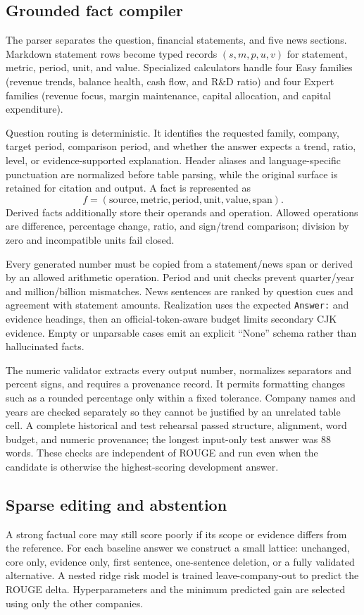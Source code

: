 \documentclass[11pt]{article}
\begin{document}
\subsection{Grounded fact compiler}
The parser separates the question, financial statements, and five news sections. Markdown statement rows become typed records $(s,m,p,u,v)$ for statement, metric, period, unit, and value. Specialized calculators handle four Easy families (revenue trends, balance health, cash flow, and R\&D ratio) and four Expert families (revenue focus, margin maintenance, capital allocation, and capital expenditure).

Question routing is deterministic.  It identifies the requested family,
company, target period, comparison period, and whether the answer expects a
trend, ratio, level, or evidence-supported explanation.  Header aliases and
language-specific punctuation are normalized before table parsing, while the
original surface is retained for citation and output.  A fact is represented
as
\[
 f=(\text{source},\text{metric},\text{period},\text{unit},
    \text{value},\text{span}).
\]
Derived facts additionally store their operands and operation.  Allowed
operations are difference, percentage change, ratio, and sign/trend comparison;
division by zero and incompatible units fail closed.

Every generated number must be copied from a statement/news span or derived by an allowed arithmetic operation. Period and unit checks prevent quarter/year and million/billion mismatches. News sentences are ranked by question cues and agreement with statement amounts. Realization uses the expected \texttt{Answer:} and evidence headings, then an official-token-aware budget limits secondary CJK evidence. Empty or unparsable cases emit an explicit ``None'' schema rather than hallucinated facts.

The numeric validator extracts every output number, normalizes separators and
percent signs, and requires a provenance record.  It permits formatting changes
such as a rounded percentage only within a fixed tolerance.  Company names and
years are checked separately so they cannot be justified by an unrelated table
cell.  A complete historical and test rehearsal passed structure, alignment,
word budget, and numeric provenance; the longest input-only test answer was 88
words.  These checks are independent of ROUGE and run even when the candidate
is otherwise the highest-scoring development answer.

\subsection{Sparse editing and abstention}
A strong factual core may still score poorly if its scope or evidence differs from the reference. For each baseline answer we construct a small lattice: unchanged, core only, evidence only, first sentence, one-sentence deletion, or a fully validated alternative. A nested ridge risk model is trained leave-company-out to predict the ROUGE delta. Hyperparameters and the minimum predicted gain are selected using only the other companies.
\end{document}
